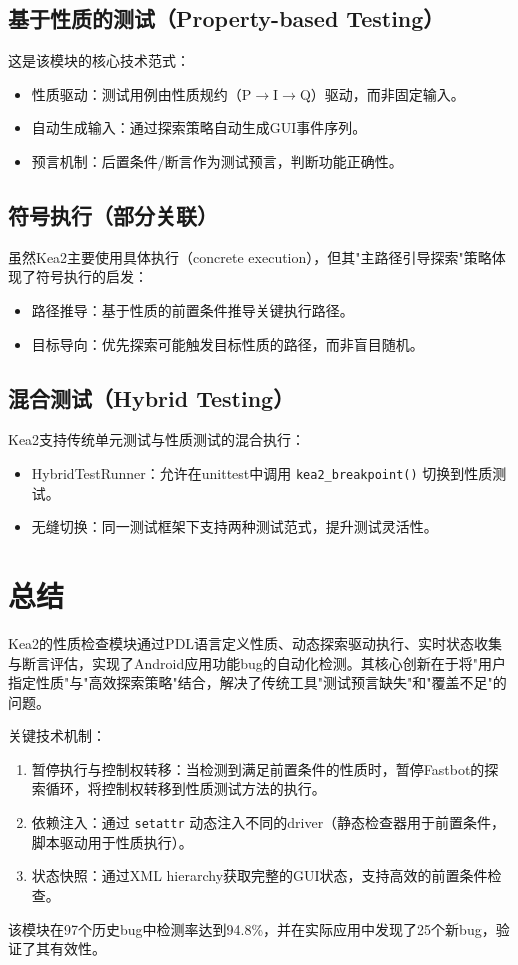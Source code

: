 \documentclass[a4paper, zihao=-4]{ctexart}
\newcommand{\bff}[1]{{\heiti #1}}
\begin{document}
\subsection{基于性质的测试（Property-based Testing）}
这是该模块的核心技术范式：
\begin{itemize}
    \item \bff{性质驱动}：测试用例由性质规约（P$\rightarrow$I$\rightarrow$Q）驱动，而非固定输入。
    \item \bff{自动生成输入}：通过探索策略自动生成GUI事件序列。
    \item \bff{预言机制}：后置条件/断言作为测试预言，判断功能正确性。
\end{itemize}

\subsection{符号执行（部分关联）}
虽然Kea2主要使用具体执行（concrete execution），但其"主路径引导探索"策略体现了符号执行的启发：
\begin{itemize}
    \item \bff{路径推导}：基于性质的前置条件推导关键执行路径。
    \item \bff{目标导向}：优先探索可能触发目标性质的路径，而非盲目随机。
\end{itemize}

\subsection{混合测试（Hybrid Testing）}
Kea2支持传统单元测试与性质测试的混合执行：
\begin{itemize}
    \item \bff{HybridTestRunner}：允许在unittest中调用 \texttt{kea2\_breakpoint()} 切换到性质测试。
    \item \bff{无缝切换}：同一测试框架下支持两种测试范式，提升测试灵活性。
\end{itemize}

\section{总结}

Kea2的性质检查模块通过PDL语言定义性质、动态探索驱动执行、实时状态收集与断言评估，实现了Android应用功能bug的自动化检测。其核心创新在于将"用户指定性质"与"高效探索策略"结合，解决了传统工具"测试预言缺失"和"覆盖不足"的问题。

\bff{关键技术机制}：
\begin{enumerate}
    \item \bff{暂停执行与控制权转移}：当检测到满足前置条件的性质时，暂停Fastbot的探索循环，将控制权转移到性质测试方法的执行。
    \item \bff{依赖注入}：通过 \texttt{setattr} 动态注入不同的driver（静态检查器用于前置条件，脚本驱动用于性质执行）。
    \item \bff{状态快照}：通过XML hierarchy获取完整的GUI状态，支持高效的前置条件检查。
\end{enumerate}

该模块在97个历史bug中检测率达到94.8\%，并在实际应用中发现了25个新bug，验证了其有效性。
\end{document}
